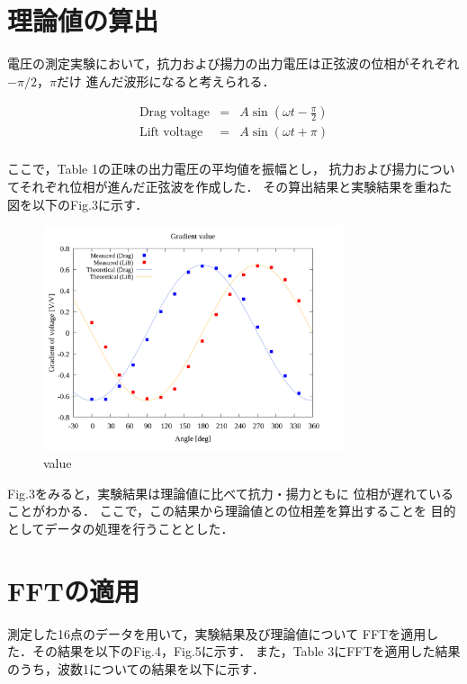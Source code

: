 \documentclass[twocolumn,a4j]{jsarticle}
\begin{document}
\newpage

\section{理論値の算出}
電圧の測定実験において，抗力および揚力の出力電圧は正弦波の位相がそれぞれ$-\pi/2$，$\pi$だけ
進んだ波形になると考えられる．

\begin{eqnarray*}
    \mathrm{Drag\;voltage} &=& A \sin\left(\omega t - \frac{\pi}{2}\right)\\
    \mathrm{Lift\;voltage} &=& A \sin\left(\omega t + \pi\right)\\
\end{eqnarray*}

ここで，Table 1の正味の出力電圧の平均値を振幅とし，
抗力および揚力についてそれぞれ位相が進んだ正弦波を作成した．
その算出結果と実験結果を重ねた図を以下のFig.3に示す．

\begin{figure}[htbp]
    \footnotesize
    \begin{center}
        \includegraphics[width=88mm]{../images_2/20/20_adjust-value.png}
        \caption{value}
    \end{center}
\end{figure}

Fig.3をみると，実験結果は理論値に比べて抗力・揚力ともに
位相が遅れていることがわかる．
ここで，この結果から理論値との位相差を算出することを
目的としてデータの処理を行うこととした．

\section{FFTの適用}

測定した16点のデータを用いて，実験結果及び理論値について
FFTを適用した．その結果を以下のFig.4，Fig.5に示す．
また，Table 3にFFTを適用した結果のうち，波数1についての結果を以下に示す．
\end{document}

